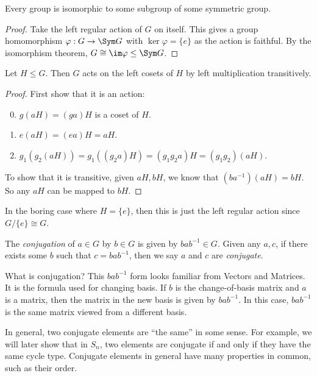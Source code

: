 \documentclass[a4paper]{article}
\begin{document}
\begin{thm}
  Every group is isomorphic to some subgroup of some symmetric group.
\end{thm}

\begin{proof}
  Take the left regular action of $G$ on itself. This gives a group homomorphism $\varphi: G\to \Sym G$ with $\ker \varphi = \{e\}$ as the action is faithful. By the isomorphism theorem, $G \cong \im \varphi \leq \Sym G$.
\end{proof}

\begin{lemma}
  Let $H\leq G$. Then $G$ acts on the left cosets of $H$ by left multiplication transitively.
\end{lemma}

\begin{proof}
  First show that it is an action:
  \begin{enumerate}[label=\arabic{*}.]
      \setcounter{enumi}{-1}
    \item $g(aH) = (ga)H$ is a coset of $H$.
    \item $e(aH) = (ea)H = aH$.
    \item $g_1(g_2(aH)) = g_1((g_2a)H) = (g_1g_2a)H = (g_1g_2)(aH)$.
  \end{enumerate}

  To show that it is transitive, given $aH, bH$, we know that $(ba^{-1})(aH) = bH$. So any $aH$ can be mapped to $bH$.
\end{proof}
In the boring case where $H = \{e\}$, then this is just the left regular action since $G/\{e\} \cong G$.

\begin{defi}
  The \emph{conjugation} of $a\in G$ by $b\in G$ is given by $bab^{-1}\in G$. Given any $a, c$, if there exists some $b$ such that $c = bab^{-1}$, then we say $a$ and $c$ are \emph{conjugate}.
\end{defi}
What is conjugation? This $bab^{-1}$ form looks familiar from Vectors and Matrices. It is the formula used for changing basis. If $b$ is the change-of-basis matrix and $a$ is a matrix, then the matrix in the new basis is given by $bab^{-1}$. In this case, $bab^{-1}$ is the same matrix viewed from a different basis.

In general, two conjugate elements are ``the same'' in some sense. For example, we will later show that in $S_n$, two elements are conjugate if and only if they have the same cycle type. Conjugate elements in general have many properties in common, such as their order.
\end{document}
